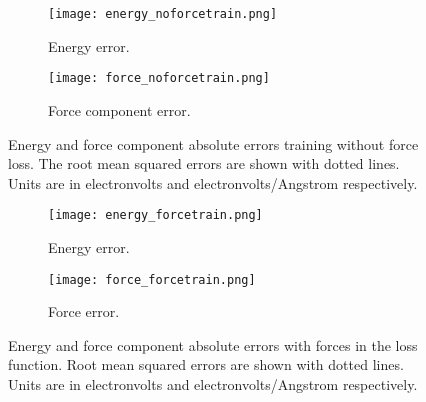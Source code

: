 \begin{figure}[H]
\begin{adjustbox}{max width=1.2\linewidth,center}
\centering
  \begin{subfigure}[b]{0.55\textwidth}
      \texttt{[image: energy\_noforcetrain.png]}
      \caption{Energy error.}
    \label{fig:f1}
  \end{subfigure}
  \hfill
  \begin{subfigure}[b]{0.55\textwidth}
      \texttt{[image: force\_noforcetrain.png]}
      \caption{Force component error.}
    \label{fig:f2}
  \end{subfigure}
\end{adjustbox}
\caption{Energy and force component absolute errors training without
    force loss. The root mean squared errors are shown with dotted lines.
    Units are in electronvolts and electronvolts/Angstrom respectively.}
    \label{fig:noforcetrain}
\end{figure}

\begin{figure}[H]
\begin{adjustbox}{max width=1.2\linewidth,center}
\centering
  \begin{subfigure}[b]{0.55\textwidth}
      \texttt{[image: energy\_forcetrain.png]}
      \caption{Energy error.}
    \label{fig:f1}
  \end{subfigure}
  \hfill
  \begin{subfigure}[b]{0.55\textwidth}
      \texttt{[image: force\_forcetrain.png]}
      \caption{Force error.}
    \label{fig:f2}
  \end{subfigure}
\end{adjustbox}
\caption{Energy and force component absolute errors with forces in the
    loss function. Root mean squared errors are shown with dotted lines.
    Units are in electronvolts and electronvolts/Angstrom respectively.}
    \label{fig:forcetrain}
\end{figure}

